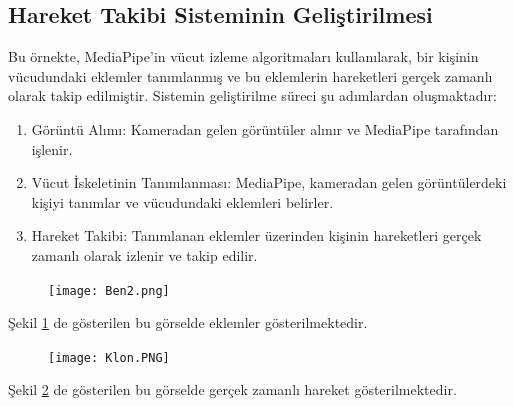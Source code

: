 \documentclass[12pt, a4paper]{article}
\begin{document}
	\subsection{Hareket Takibi Sisteminin Geliştirilmesi}
	Bu örnekte, MediaPipe'in vücut izleme algoritmaları kullanılarak, bir kişinin vücudundaki eklemler tanımlanmış ve bu eklemlerin hareketleri gerçek zamanlı olarak takip edilmiştir. Sistemin geliştirilme süreci şu adımlardan oluşmaktadır:
	\begin{enumerate}
	\item	Görüntü Alımı: Kameradan gelen görüntüler alınır ve MediaPipe tarafından işlenir.
	\item	Vücut İskeletinin Tanımlanması: MediaPipe, kameradan gelen görüntülerdeki kişiyi tanımlar ve vücudundaki eklemleri belirler.
	\item	Hareket Takibi: Tanımlanan eklemler üzerinden kişinin hareketleri gerçek zamanlı olarak izlenir ve takip edilir.
	\end{enumerate}
	\begin{figure}[!ht]
		\caption{}
		\centering
		\texttt{[image: Ben2.png]}
		
	
	\label{Ben}
	\end{figure}
	\newpage
	Şekil \ref{Ben} de gösterilen bu görselde eklemler gösterilmektedir.
	\begin{figure}[!ht]
		\caption{}
		\centering
		\texttt{[image: Klon.PNG]}
		
		\label{Klon}
	\end{figure}
	\newpage
	Şekil \ref{Klon} de gösterilen bu görselde gerçek zamanlı hareket gösterilmektedir.
	\newpage
\end{document}
